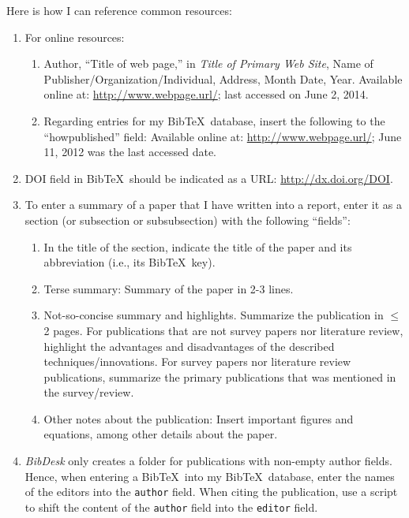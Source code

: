 Here is how I can reference common resources: \vspace{-0.3cm}
\begin{enumerate} \itemsep -4pt
\item For online resources: \vspace{-0.3cm}
	\begin{enumerate} \itemsep -2pt
	\item Author, ``Title of web page,'' in {\it Title of Primary Web Site}, Name of Publisher/Organization/Individual, Address, Month Date, Year. Available online at: \url{http://www.webpage.url/}; last accessed on June 2, 2014.	%
	\item Regarding entries for my {\sc Bib}\TeX\ database, insert the following to the ``howpublished'' field: Available online at: \url{http://www.webpage.url/}; June 11, 2012 was the last accessed date.	%
	\end{enumerate}
\item DOI field in {\sc Bib}\TeX\ should be indicated as a URL: \url{http://dx.doi.org/DOI}.	%
\item To enter a summary of a paper that I have written into a report, enter it as a section (or subsection or subsubsection) with the following ``fields'': \vspace{-0.3cm}
	\begin{enumerate} \itemsep -2pt
	\item In the title of the section, indicate the title of the paper and its abbreviation (i.e., its {\sc Bib}\TeX\ key).
	\item Terse summary: Summary of the paper in 2-3 lines.
	\item Not-so-concise summary and highlights. Summarize the publication in $\leq$ 2 pages. For publications that are not survey papers nor literature review, highlight the advantages and disadvantages of the described techniques/innovations. For survey papers nor literature review publications, summarize the primary publications that was mentioned in the survey/review.
	\item Other notes about the publication: Insert important figures and equations, among other details about the paper.
	\end{enumerate}
\item {\it BibDesk} only creates a folder for publications with non-empty author fields. Hence, when entering a {\sc Bib}\TeX\ into my {\sc Bib}\TeX\ database, enter the names of the editors into the {\tt author} field. When citing the publication, use a script to shift the content of the {\tt author} field into the {\tt editor} field.


\end{enumerate}
